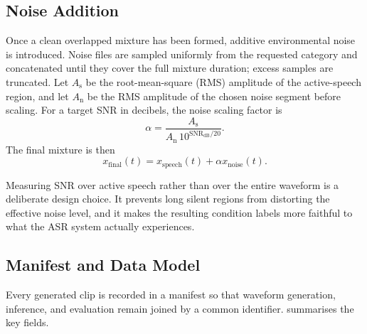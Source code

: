 \subsection{Noise Addition}
Once a clean overlapped mixture has been formed, additive environmental noise is introduced. Noise files are sampled uniformly from the requested category and concatenated until they cover the full mixture duration; excess samples are truncated. Let $A_{\mathrm{s}}$ be the root-mean-square (RMS) amplitude of the active-speech region, and let $A_{\mathrm{n}}$ be the RMS amplitude of the chosen noise segment before scaling. For a target SNR in decibels, the noise scaling factor is
\begin{equation}
\alpha = \frac{A_{\mathrm{s}}}{A_{\mathrm{n}}\,10^{\mathrm{SNR}_{\mathrm{dB}}/20}}.
\end{equation}
The final mixture is then
\begin{equation}
 x_{\mathrm{final}}(t) = x_{\mathrm{speech}}(t) + \alpha x_{\mathrm{noise}}(t).
\end{equation}

Measuring SNR over active speech rather than over the entire waveform is a deliberate design choice. It prevents long silent regions from distorting the effective noise level, and it makes the resulting condition labels more faithful to what the ASR system actually experiences.

\subsection{Manifest and Data Model}
Every generated clip is recorded in a manifest so that waveform generation, inference, and evaluation remain joined by a common identifier.  summarises the key fields.

